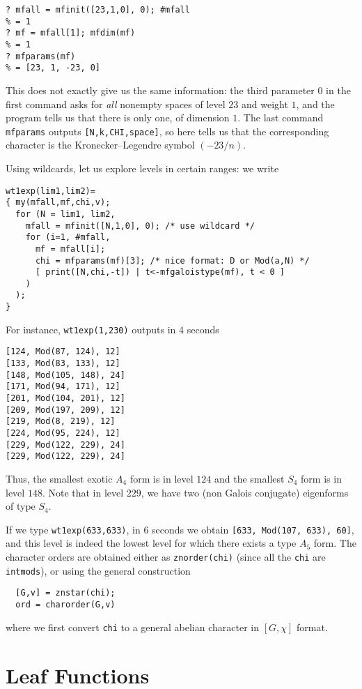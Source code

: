 \documentclass[11pt]{article}
\def\kbd#1{{\tt #1}}
\begin{document}
\begin{verbatim}
? mfall = mfinit([23,1,0], 0); #mfall
% = 1
? mf = mfall[1]; mfdim(mf)
% = 1
? mfparams(mf)
% = [23, 1, -23, 0]
\end{verbatim}

This does not exactly give us the same information: the third parameter $0$
in the first command asks for \emph{all} nonempty spaces of level $23$ and
weight $1$, and the program tells us that there is only one, of dimension $1$.
The last command \kbd{mfparams} outputs \kbd{[N,k,CHI,space]}, so here tells
us that the corresponding character is the Kronecker--Legendre symbol $(-23/n)$.

Using wildcards, let us explore levels in certain ranges: we write
\begin{verbatim}
wt1exp(lim1,lim2)=
{ my(mfall,mf,chi,v);
  for (N = lim1, lim2,
    mfall = mfinit([N,1,0], 0); /* use wildcard */
    for (i=1, #mfall,
      mf = mfall[i];
      chi = mfparams(mf)[3]; /* nice format: D or Mod(a,N) */
      [ print([N,chi,-t]) | t<-mfgaloistype(mf), t < 0 ]
    )
  );
}
\end{verbatim}

For instance, \kbd{wt1exp(1,230)} outputs in 4 seconds

\begin{verbatim}
[124, Mod(87, 124), 12]
[133, Mod(83, 133), 12]
[148, Mod(105, 148), 24]
[171, Mod(94, 171), 12]
[201, Mod(104, 201), 12]
[209, Mod(197, 209), 12]
[219, Mod(8, 219), 12]
[224, Mod(95, 224), 12]
[229, Mod(122, 229), 24]
[229, Mod(122, 229), 24]
\end{verbatim}

Thus, the smallest exotic $A_4$ form is in level $124$ and the smallest $S_4$
form is in level $148$. Note that in level $229$, we have two (non Galois
conjugate) eigenforms of type $S_4$.

If we type \kbd{wt1exp(633,633)}, in 6 seconds we obtain \kbd{[633, Mod(107,
633), 60]}, and this level is indeed the lowest level for which there exists
a type $A_5$ form. The character orders are obtained either as
\kbd{znorder(chi)} (since all the \kbd{chi} are \kbd{intmods}), or
using the general construction
\begin{verbatim}
  [G,v] = znstar(chi);
  ord = charorder(G,v)
\end{verbatim}
where we first convert \kbd{chi} to a general abelian character in
$[G,\chi]$ format.

\section{Leaf Functions}
\end{document}
